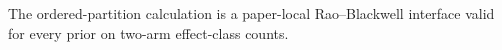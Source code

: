 The ordered-partition calculation is a paper-local Rao--Blackwell interface valid for every prior on two-arm effect-class counts.